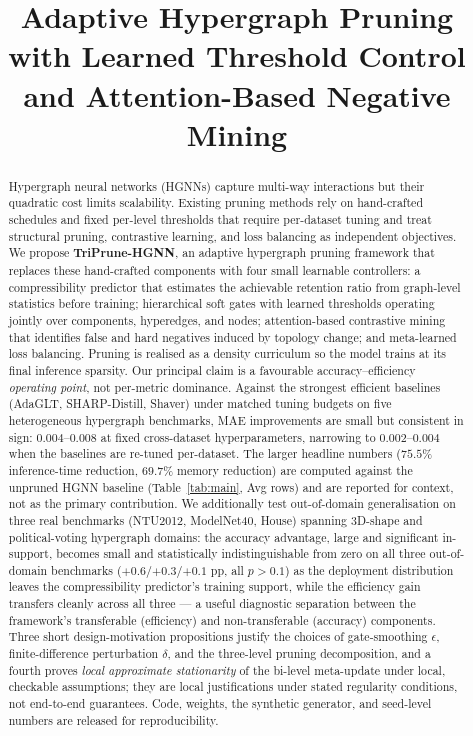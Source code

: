 \documentclass[10pt]{article}
\title{Adaptive Hypergraph Pruning with Learned Threshold Control and Attention-Based Negative Mining}
\theoremstyle{plain}
\theoremstyle{definition}
\begin{document}
\maketitle
\begin{abstract}
Hypergraph neural networks (HGNNs) capture multi-way interactions but their quadratic cost limits scalability. Existing pruning methods rely on hand-crafted schedules and fixed per-level thresholds that require per-dataset tuning and treat structural pruning, contrastive learning, and loss balancing as independent objectives. We propose \textbf{TriPrune-HGNN}, an adaptive hypergraph pruning framework that replaces these hand-crafted components with four small learnable controllers: a compressibility predictor that estimates the achievable retention ratio from graph-level statistics before training; hierarchical soft gates with learned thresholds operating jointly over components, hyperedges, and nodes; attention-based contrastive mining that identifies false and hard negatives induced by topology change; and meta-learned loss balancing. Pruning is realised as a density curriculum so the model trains at its final inference sparsity. Our principal claim is a favourable accuracy--efficiency \emph{operating point}, not per-metric dominance. Against the strongest efficient baselines (AdaGLT, SHARP-Distill, Shaver) under matched tuning budgets on five heterogeneous hypergraph benchmarks, MAE improvements are small but consistent in sign: $0.004$--$0.008$ at fixed cross-dataset hyperparameters, narrowing to $0.002$--$0.004$ when the baselines are re-tuned per-dataset. The larger headline numbers ($75.5\%$ inference-time reduction, $69.7\%$ memory reduction) are computed against the unpruned HGNN baseline (Table~\ref{tab:main}, Avg rows) and are reported for context, not as the primary contribution. We additionally test out-of-domain generalisation on three real benchmarks (NTU2012, ModelNet40, House) spanning 3D-shape and political-voting hypergraph domains: the accuracy advantage, large and significant in-support, becomes small and statistically indistinguishable from zero on all three out-of-domain benchmarks ($+0.6$/$+0.3$/$+0.1$ pp, all $p>0.1$) as the deployment distribution leaves the compressibility predictor's training support, while the efficiency gain transfers cleanly across all three --- a useful diagnostic separation between the framework's transferable (efficiency) and non-transferable (accuracy) components. Three short design-motivation propositions justify the choices of gate-smoothing $\epsilon$, finite-difference perturbation $\delta$, and the three-level pruning decomposition, and a fourth proves \emph{local approximate stationarity} of the bi-level meta-update under local, checkable assumptions; they are local justifications under stated regularity conditions, not end-to-end guarantees. Code, weights, the synthetic generator, and seed-level numbers are released for reproducibility.
\end{abstract}
\end{document}
